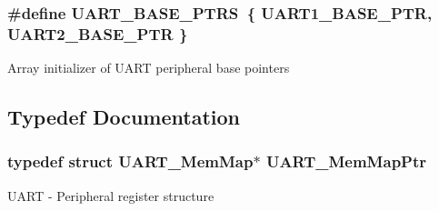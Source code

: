 \subsubsection[{U\+A\+R\+T\+\_\+\+B\+A\+S\+E\+\_\+\+P\+T\+R\+S}]{\setlength{\rightskip}{0pt plus 5cm}\#define U\+A\+R\+T\+\_\+\+B\+A\+S\+E\+\_\+\+P\+T\+R\+S~\{ {\bf U\+A\+R\+T1\+\_\+\+B\+A\+S\+E\+\_\+\+P\+T\+R}, {\bf U\+A\+R\+T2\+\_\+\+B\+A\+S\+E\+\_\+\+P\+T\+R} \}}\label{group___u_a_r_t___peripheral_ga7b34a38b9492a1e1007b2f66383aef17}
Array initializer of U\+A\+R\+T peripheral base pointers 

\subsection{Typedef Documentation}
\hypertarget{group___u_a_r_t___peripheral_ga306cf44b593fadbb29a065f42e3f68f0}{}
\subsubsection[{U\+A\+R\+T\+\_\+\+Mem\+Map\+Ptr}]{\setlength{\rightskip}{0pt plus 5cm}typedef struct {\bf U\+A\+R\+T\+\_\+\+Mem\+Map}$\ast$ {\bf U\+A\+R\+T\+\_\+\+Mem\+Map\+Ptr}}\label{group___u_a_r_t___peripheral_ga306cf44b593fadbb29a065f42e3f68f0}
U\+A\+R\+T -\/ Peripheral register structure 